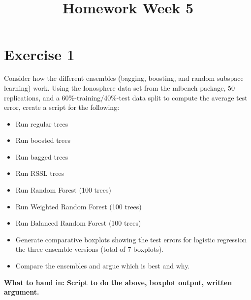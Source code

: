 \documentclass[a4paper]{article}
\begin{document}
\title{Homework Week 5}

\maketitle

\section{Exercise 1}

Consider how the different ensembles (bagging, boosting, and random subspace learning) work. Using the Ionosphere data set from the mlbench package, 50 replications, and a 60\%-training/40\%-test data split to compute the average test error, create a script for the following:

\begin{itemize}
\item Run regular trees
\item Run boosted trees
\item Run bagged trees
\item Run RSSL trees
\item Run Random Forest (100 trees)
\item Run Weighted Random Forest (100 trees)
\item Run Balanced Random Forest (100 trees)
\item Generate comparative boxplots showing the test errors for logistic regression  the three ensemble versions (total of 7 boxplots).
\item Compare the ensembles and argue which is best and why.
\end{itemize}

\textbf{What to hand in: Script to do the above, boxplot output, written argument.}
\end{document}
